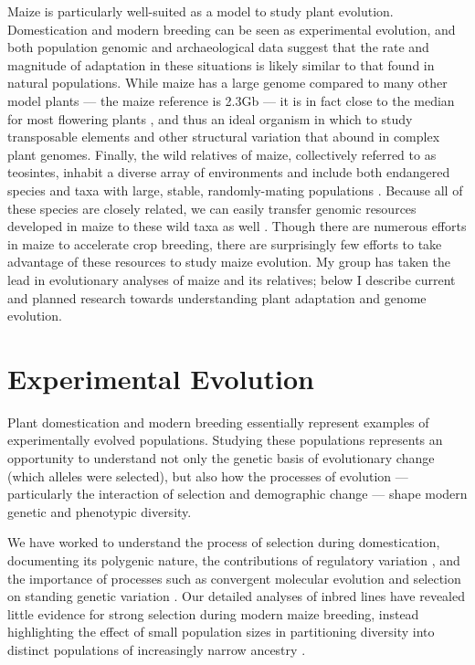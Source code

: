 \documentclass[11pt,letterpaper]{article}
\begin{document}
Maize is particularly well-suited as a model to study plant evolution.
Domestication and modern breeding can be seen as experimental evolution, and both population genomic \citep{hufford2012comparative} and archaeological data \citep{purugganan2011archaeological} suggest that the rate and magnitude of adaptation in these situations is likely similar to that found in natural populations.
While maize has a large genome compared to many other model plants --- the maize reference is 2.3Gb \citep{schnable2009b73} ---  it is in fact close to the median for most flowering plants \citep{leitch2013genome}, and thus an ideal organism in which to study transposable elements and other structural variation that abound in complex plant genomes.  
Finally, the wild relatives of maize, collectively referred to as teosintes, inhabit a diverse array of environments and include both endangered species and taxa with large, stable, randomly-mating populations \citep{hufford2012teosinte}.
Because all of these species are closely related, we can easily transfer genomic resources developed in maize to these wild taxa as well \citep[e.g.][]{pyhajarvi2013complex,fang2012megabase}.
Though there are numerous efforts in maize to accelerate crop breeding, there are surprisingly few efforts to take advantage of these resources to study maize evolution. 
My group has taken the lead in evolutionary analyses of maize and its relatives; below I describe current and planned research towards understanding plant adaptation and genome evolution.  

\section*{Experimental Evolution} %

Plant domestication and modern breeding essentially represent examples of experimentally evolved populations. Studying these populations represents an opportunity to understand not only the genetic basis of evolutionary change (which alleles were selected), but also how the processes of evolution --- particularly the interaction of selection and demographic change --- shape modern genetic and phenotypic diversity.

We have worked to understand the process of selection during domestication, documenting its polygenic nature, the contributions of regulatory variation \citep{hufford2012comparative,swanson2012reshaping}, and the importance of processes such as convergent molecular evolution \citep{wills2013many} and selection on standing genetic variation \citep{wills2013many, studer2011identification, vann2015natural}. 
Our detailed analyses of  inbred lines have revealed little evidence for strong selection during modern maize breeding, instead highlighting the effect of small population sizes in partitioning diversity into distinct populations of increasingly narrow ancestry \citep{van2012historical}.
\end{document}
